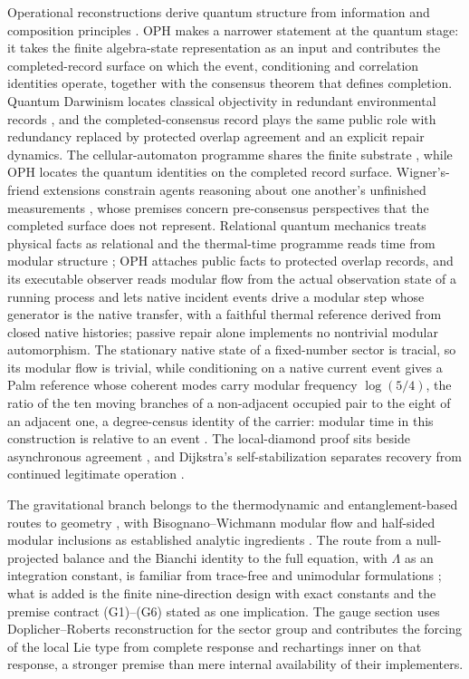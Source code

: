 \documentclass[11pt]{article}
\theoremstyle{definition}
\theoremstyle{remark}
\begin{document}
Operational reconstructions derive quantum structure from information and
composition principles \cite{hardy2001,chiribella2011,masanes2011}. OPH makes
a narrower statement at the quantum stage: it takes the finite algebra-state
representation as an input and contributes the completed-record surface on
which the event, conditioning and correlation identities operate, together
with the consensus theorem that defines completion. Quantum Darwinism
locates classical objectivity in redundant environmental records
\cite{zurek2003}, and the completed-consensus record plays the same public
role with redundancy replaced by protected overlap agreement and an explicit
repair dynamics. The cellular-automaton programme shares the finite substrate
\cite{thooft2016}, while OPH locates the quantum identities on the completed
record surface. Wigner's-friend extensions constrain agents reasoning about
one another's unfinished measurements \cite{fr2018}, whose premises concern
pre-consensus perspectives that the completed surface does not represent.
Relational quantum mechanics treats physical facts as relational
\cite{rovelli1996} and the thermal-time programme reads time from modular
structure \cite{connesrovelli1994}; OPH attaches public facts to protected
overlap records, and its executable observer reads modular flow from the
actual observation state of a running process and lets native incident
events drive a modular step whose generator is the native transfer, with a
faithful thermal reference derived from closed native histories; passive
repair alone implements no nontrivial modular automorphism. The stationary
native state of a fixed-number sector is tracial, so its modular flow is
trivial, while conditioning on a native current event gives a Palm
reference whose coherent modes carry modular frequency $\log(5/4)$, the
ratio of the ten moving branches of a non-adjacent occupied pair to the
eight of an adjacent one, a degree-census identity of the carrier: modular
time in this construction is relative to an event \cite{ophmodel}. The local-diamond proof sits beside asynchronous agreement \cite{lamport1982,flp1985}, and
Dijkstra's self-stabilization separates recovery from continued legitimate
operation \cite{dijkstra1974}.

The gravitational branch belongs to the thermodynamic and
entanglement-based routes to geometry \cite{jacobson95,jacobson16,vanraamsdonk2010},
with Bisognano--Wichmann modular flow and half-sided modular inclusions as
established analytic ingredients \cite{bw75,bw76,wiesbrock93}. The route from
a null-projected balance and the Bianchi identity to the full equation, with
$\Lambda$ as an integration constant, is familiar from trace-free and
unimodular formulations \cite{vdbij1982,ellis2011}; what is added is the
finite nine-direction design with exact constants and the premise contract
(G1)--(G6) stated as one implication. The gauge section uses
Doplicher--Roberts reconstruction for the sector group \cite{dr89,dr90} and
contributes the forcing of the local Lie type from complete response and
rechartings inner on that response, a stronger premise than mere internal
availability of their implementers.
\end{document}
